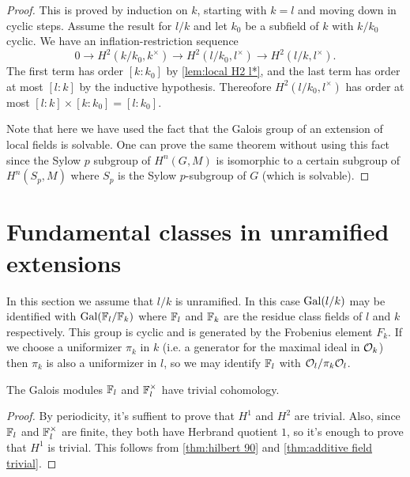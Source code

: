 \begin{proof}
	This is proved by induction on $k$, starting with $k=l$ and moving down in
	cyclic steps. Assume the result for $l/k$ and let $k_0$ be a subfield of $k$ with $k/k_0$ cyclic.
	We have an inflation-restriction sequence
	\[
		0 \to H^2(k/k_0, k^\times) \to H^2( l/k_0, l^\times) \to H^2(l/k, l^\times).
	\]
	The first term has order $[k : k_0]$ by \ref{lem:local H2 l*}, and the last term has
	order at most $[l:k]$ by the inductive hypothesis.
	Thereofore $H^2( l/k_0, l^\times)$ has order at most $[l:k] \times [k : k_0] = [l: k_0]$.

	Note that here we have used the fact that the Galois group of an extension of local fields is
	solvable.
	One can prove the same theorem without using this fact since the Sylow $p$ subgroup
	of $H^n(G,M)$ is isomorphic to a certain subgroup of $H^n(S_p,M)$ where $S_p$ is
	the Sylow $p$-subgroup of $G$ (which is solvable).
\end{proof}







\section{Fundamental classes in unramified extensions}

In this section we assume that $l/k$ is unramified.
In this case $\mathrm{Gal}(l/k)$ may be identified with $\mathrm{Gal}({\mathbb F}_l / {\mathbb F}_k)$ where
${\mathbb F}_l$ and ${\mathbb F}_k$ are the residue class fields of $l$ and $k$ respectively.
This group is cyclic and is generated by the Frobenius element $F_k$.
If we choose a uniformizer $\pi_k$ in $k$ (i.e. a generator for the maximal ideal in ${\mathcal O}_k$)
then $\pi_k$ is also a uniformizer in $l$, so we may identify ${\mathbb F}_l$ with ${\mathcal O}_l / \pi_k {\mathcal O}_l$.

\begin{lemma} \label{lem:finite field trivial}
	The Galois modules ${\mathbb F}_l$ and ${\mathbb F}_l^\times$ have trivial cohomology.
\end{lemma}

\begin{proof}
	By periodicity, it's suffient to prove that $H^1$ and $H^2$ are trivial.
	Also, since ${\mathbb F}_l$ and ${\mathbb F}_l^\times$ are finite, they both have Herbrand quotient $1$,
	so it's enough to prove that $H^1$ is trivial.
	This follows from \ref{thm:hilbert 90} and \ref{thm:additive field trivial}.
\end{proof}


